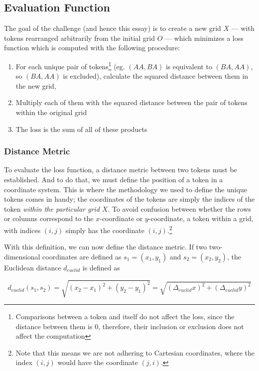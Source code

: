 \subsection{Evaluation Function}%
\label{sub:evaluation_function}

The goal of the challenge (and hence this essay) is to create a new grid $X$ --- with tokens rearranged arbitrarily from the initial grid $O$ --- which minimizes a loss function which is computed with the following procedure:
\begin{enumerate}
    \item For each unique pair of tokens\footnote{Comparisons between a token and itself do not affect the loss, since the distance between them is $0$, therefore, their inclusion or exclusion does not affect the computation} (eg. $(AA,BA)$ is equivalent to $(BA,AA)$, so $(BA,AA)$ is excluded), calculate the squared distance between them in the new grid,
    \item Multiply each of them with the squared distance between the pair of tokens within the original grid
    \item The loss is the sum of all of these products
\end{enumerate}

\subsubsection{Distance Metric}%
\label{ssub:distance_metric}
To evaluate the loss function, a distance metric between two tokens must be established. And to do that, we must define the position of a token in a coordinate system. This is where the methodology we used to define the unique tokens comes in handy; the coordinates of the tokens are simply the indices of the token \emph{within the particular grid $X$}. To avoid confusion between whether the rows or columns correspond to the $x$-coordinate or $y$-coordinate, a token within a grid, with indices $(i,j)$ simply has the coordinate $(i,j)$.\footnote{Note that this means we are not adhering to Cartesian coordinates, where the index $(i,j)$ would have the coordinate $(j,i)$.}

With this definition, we can now define the distance metric. If two two-dimensional coordinates are defined as $s_1=(x_1,y_1)$ and $s_2=(x_2,y_2)$, the Euclidean distance $d_{euclid}$ is defined as

\begin{equation}
    \label{eq:euclid}
    d_{euclid}(s_1,s_2)=\sqrt{(x_2-x_1)^2+(y_2-y_1)^2}=\sqrt{(\Delta_{euclid} x)^2+(\Delta_{euclid} y)^2}
\end{equation}


